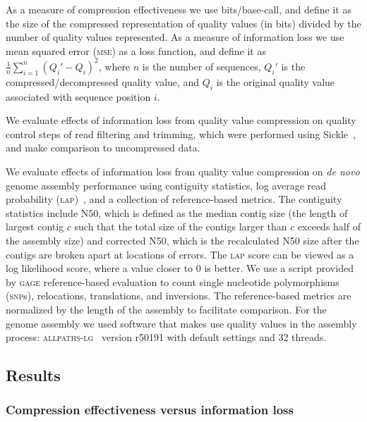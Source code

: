 As a measure of compression effectiveness we use bits/base-call, and
define it as the size of the compressed representation of quality
values (in bits) divided by the number of quality values represented.
As a measure of information loss we use mean squared error
(\textsc{mse}) as a loss function, and define it as
$\frac{1}{n}\sum_{i=1}^{n}{(Q_i'-Q_i)^2}$, where $n$ is the number of
sequences, $Q_i'$ is the compressed/decompressed quality value, and
$Q_i$ is the original quality value associated with sequence position
$i$.

We evaluate effects of information loss from quality value compression
on quality control steps of read filtering and trimming, which were
performed using Sickle~\cite{sickle}, and make comparison to
uncompressed data.

We evaluate effects of information loss from quality value compression
on \emph{de novo} genome assembly performance using contiguity
statistics, log average read probability
(\textsc{lap})~\cite{LAP}, and a collection of
reference-based metrics. The contiguity statistics include N50, which is defined as the median contig
size (the length of largest contig $c$ such that the total size of the
contigs larger than $c$ exceeds half of the assembly size) and corrected N50, which is the recalculated N50 size after the contigs are broken apart at locations of errors. The
\textsc{lap} score can be viewed as a log likelihood score, where a
value closer to 0 is better. We use a script provided by \textsc{gage}
reference-based evaluation to count single nucleotide polymorphisms
(\textsc{snp}s), relocations, translations, and inversions. The
reference-based metrics are normalized by the length of the assembly
to facilitate comparison. For the genome assembly we used software
that makes use quality values in the assembly process:
\textsc{allpaths-lg}~\cite{Gnerre:2011kx} version r50191 with default
settings and 32 threads.

\subsection{Results}

\subsubsection{Compression effectiveness versus information loss}

